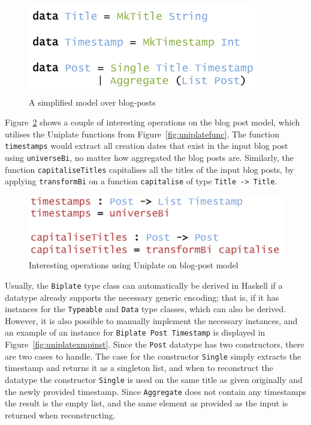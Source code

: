 \documentclass{ituthesis}
\newcommand{\ttconstructor}[1]{\textcolor{constructor-color}{\texttt{#1}}}
\newcommand{\tttype}[1]{\textcolor{type-color}{\texttt{#1}}}
\newcommand{\ttdec}[1]{\textcolor{declared-var-color}{\texttt{#1}}}
\theoremstyle{break}
\begin{document}
\begin{figure}[ht]
\begin{center}
    \includegraphics[scale=0.5]{Figures/UniplateExampleData.png}
\end{center}
\caption{A simplified model over blog-posts}
\label{fig:uniplateexmpdata}
\end{figure}

Figure~\ref{fig:uniplateexmpops} shows a couple of interesting operations on the blog post model, which utilises the Uniplate functions from Figure~\ref{fig:uniplatefunc}.
The function \ttdec{timestamps} would extract all creation dates that exist in the input blog post using \ttdec{universeBi}, no matter how aggregated the blog posts are.
Similarly, the function \ttdec{capitaliseTitles} capitalises all the titles of the input blog posts, by applying \ttdec{transformBi} on a function \ttdec{capitalise} of type \tttype{Title}\texttt{~->~}\tttype{Title}.

\begin{figure}[ht]
\begin{center}
    \includegraphics[scale=0.5]{Figures/UniplateExampleOperations.png}
\end{center}
\caption{Interesting operations using Uniplate on blog-post model}
\label{fig:uniplateexmpops}
\end{figure}

Usually, the \tttype{Biplate} type class can automatically be derived in Haskell if a datatype already supports the necessary generic encoding; that is, if it has instances for the \tttype{Typeable} and \tttype{Data} type classes, which can also be derived.
However, it is also possible to manually implement the necessary instances, and an example of an instance for \tttype{Biplate}~\tttype{Post}~\tttype{Timestamp} is displayed in Figure~\ref{fig:uniplatexmpinst}.
Since the \tttype{Post} datatype has two constructors, there are two cases to handle.
The case for the constructor \ttconstructor{Single} simply extracts the timestamp and returns it as a singleton list, and when to reconstruct the datatype the constructor \ttconstructor{Single} is used
on the same title as given originally and the newly provided timestamp.
Since \ttconstructor{Aggregate} does not contain any timestamps the result is the empty list, and the same element as provided as the input is returned when reconstructing.
\end{document}
